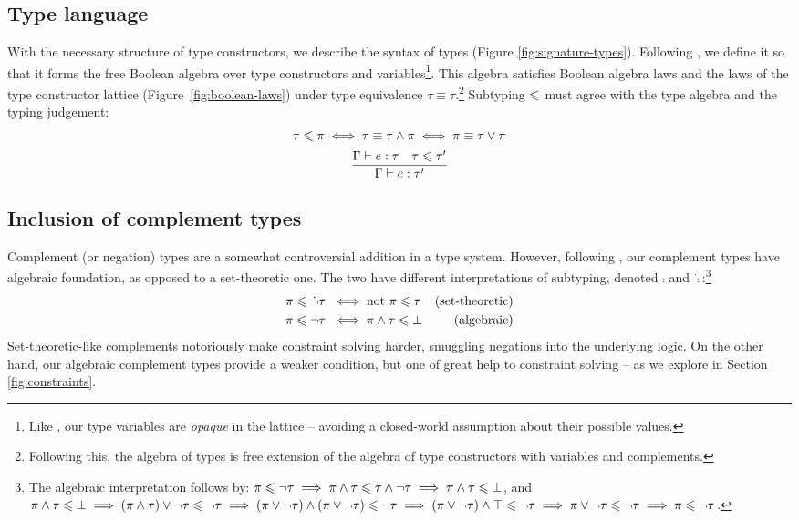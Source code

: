 \subsection{Type language}

With the necessary structure of type constructors, we describe the syntax of types (Figure \ref{fig:signature-types}). Following \textcite{mlstruct}, we define it so that it forms the free Boolean algebra over type constructors and variables\footnote{Like \textcite{dolan-thesis}, our type variables are \emph{opaque} in the lattice -- avoiding a closed-world assumption about their possible values.}. This algebra satisfies Boolean algebra laws and the laws of the type constructor lattice (Figure~\ref{fig:boolean-laws}) under type equivalence $\tau \equiv \tau$.\footnote{Following this, the algebra of types is free extension of the algebra of type constructors with variables and complements.} Subtyping $\leqslant$ must agree with the type algebra and the typing judgement:
$$ \begin{array}{c}
   \tau \leqslant \pi \iff \tau \equiv \tau \land \pi \iff \pi \equiv \tau \lor \pi \\[5pt]
   \dfrac{\Gamma \vdash e : \tau \quad \tau \leqslant \tau'}{\Gamma \vdash e : \tau'}
\end{array} $$

\subsection{Inclusion of complement types} 
\label{subsec:oh-god-complements}
Complement (or negation) types are a somewhat controversial addition in a type system. However, following \textcite{mlstruct}, our complement types have algebraic foundation, as opposed to a set-theoretic one. The two have different interpretations of subtyping, denoted $\comp$ and $\dot \comp$:\footnote{The algebraic interpretation follows by: $\pi \leqslant \lnot \tau \implies \pi \land \tau \leqslant \tau \land \lnot \tau \implies \pi \land \tau \leqslant \bot$, and $\pi \land \tau \leqslant \bot \implies (\pi \land \tau) \lor \lnot \tau \leqslant \lnot \tau \implies (\pi \lor \lnot \tau) \land (\pi \lor \lnot \tau) \leqslant \lnot \tau \implies (\pi \lor \lnot \tau) \land \top \leqslant \lnot \tau \implies \pi \lor \lnot \tau \leqslant \lnot \tau \implies \pi \leqslant \lnot \tau$.}
\begin{align*}
    \pi \leqslant \dot {\lnot} \tau \;&\iff \text{not } \pi \leqslant \tau & \text{(set-theoretic)} \\
    \pi \leqslant \lnot \tau \;&\iff \pi \land \tau \leqslant \bot & \text{(algebraic)} 
\end{align*}
Set-theoretic-like complements notoriously make constraint solving harder, smuggling negations into the underlying logic. On the other hand, our algebraic complement types provide a weaker condition, but one of great help to constraint solving -- as we explore in Section \ref{fig:constraints}.

